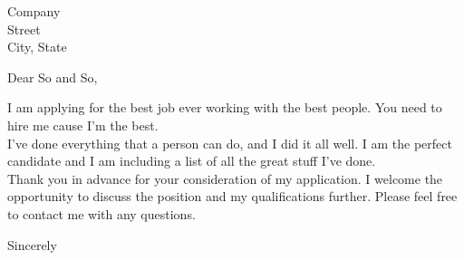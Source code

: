 \documentclass[standard,letterpaper,pagesize,UScommercial9]{scrlttr2}
\begin{document}
   
  \begin{letter}{
         Company\\%
         Street\\%
        City, State
 }
 \opening{Dear So and So,}
  
I am applying for the best job ever working with the best people.  You need to hire me cause I'm the best. \\

I've done everything that a person can do, and I did it all well.  I am the perfect candidate and I am including a list of all the great stuff I've done. \\
  
Thank you in advance for your consideration of my application. I welcome the opportunity to discuss the position and my qualifications further. Please feel free to contact me with any questions.
 
 \closing{Sincerely}
  
  
 \end{letter}
 
\end{document}
